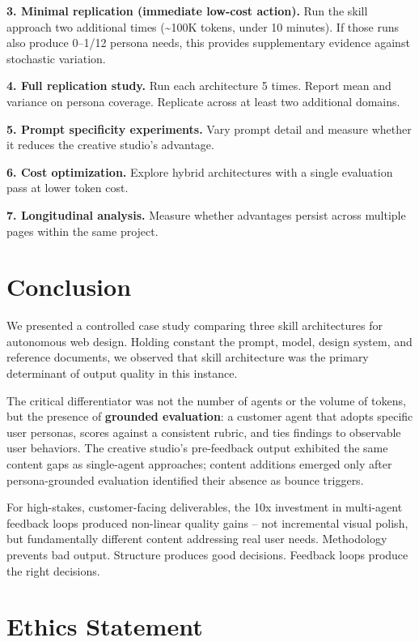 \documentclass[conference]{IEEEtran}
\begin{document}
\textbf{3. Minimal replication (immediate low-cost action).} Run the skill approach two additional times (\textasciitilde100K tokens, under 10 minutes). If those runs also produce 0--1/12 persona needs, this provides supplementary evidence against stochastic variation.

\textbf{4. Full replication study.} Run each architecture 5 times. Report mean and variance on persona coverage. Replicate across at least two additional domains.

\textbf{5. Prompt specificity experiments.} Vary prompt detail and measure whether it reduces the creative studio's advantage.

\textbf{6. Cost optimization.} Explore hybrid architectures with a single evaluation pass at lower token cost.

\textbf{7. Longitudinal analysis.} Measure whether advantages persist across multiple pages within the same project.

\section{Conclusion}\label{conclusion}

We presented a controlled case study comparing three skill architectures for autonomous web design. Holding constant the prompt, model, design system, and reference documents, we observed that skill architecture was the primary determinant of output quality in this instance.

The critical differentiator was not the number of agents or the volume of tokens, but the presence of \textbf{grounded evaluation}: a customer agent that adopts specific user personas, scores against a consistent rubric, and ties findings to observable user behaviors. The creative studio's pre-feedback output exhibited the same content gaps as single-agent approaches; content additions emerged only after persona-grounded evaluation identified their absence as bounce triggers.

For high-stakes, customer-facing deliverables, the 10x investment in multi-agent feedback loops produced non-linear quality gains -- not incremental visual polish, but fundamentally different content addressing real user needs. Methodology prevents bad output. Structure produces good decisions. Feedback loops produce the right decisions.

\section{Ethics Statement}\label{ethics-statement}
\end{document}
